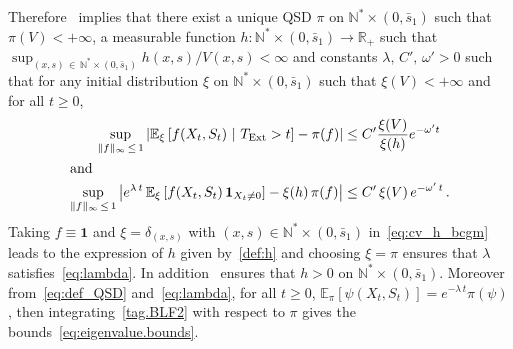 \documentclass[AHL,Unicode,longabstracts,published]{cedram}
\newcommand{\RR}{\mathbb{R}}
\newcommand{\NN}{\mathbb{N}}
\newcommand{\EE}{\mathbb{E}}
\newcommand{\X}{\NN^* \times (0,\bar s_1)}
\newcommand{\Text}{T_{\mathrm{Ext}}}
\newcommand{\1}{\mathbf{1}}
\begin{document}
Therefore~\cite[Theorem~5.1]{BCGM} implies that there exist a unique QSD $\pi$ on $\X$ such that $\pi(V)<+\infty$, a measurable function $h:\X \to \RR_+$ such that $\sup_{(x,s)\,\in\,\X}h(x,s)/V(x,s)<\infty$ and constants $\lambda, \, C',\, \omega'>0$ such that for any initial distribution $\xi$ on $\X$ such that $\xi(V)<+\infty$ and for all $t\geq 0$,
\begin{align}
\sup_{\|f \|_\infty\, \leq\,1} \left|\EE_\xi \left[f(X_t,S_t) \ | \ \Text>t\right] - \pi(f) \right| &\leq C '\frac{\xi(V)}{\xi(h)} e^{-\omega' t}\,\label{eq:cv_qsd_X}
\\
\intertext{and}
\sup_{\|f \|_\infty\,\leq\,1} \left|e^{\lambda \,t}\,\EE_\xi\left[f(X_t,S_t)\,\1_{X_t\neq 0}\right]-\xi(h)\,\pi(f)\right|&\leq C'\,\xi(V)\,e^{-\omega'\,t}\,.\label{eq:cv_h_bcgm}
\end{align}
Taking $f\equiv \1$ and $\xi=\delta_{(x,s)}$ with $(x,s)\in\X$ in~\eqref{eq:cv_h_bcgm} leads to the expression of $h$ given by~\eqref{def:h} and choosing $\xi=\pi$ ensures that $\lambda$ satisfies~\eqref{eq:lambda}. In addition~\cite[Lemma~3.4.]{BCGM} ensures that $h>0$ on $\X$. Moreover from~\eqref{eq:def_QSD} and~\eqref{eq:lambda}, for all $t\geq 0$, $\EE_\pi[\psi(X_t,S_t)]=e^{-\lambda\,t}\pi(\psi)$, then integrating~\eqref{tag.BLF2} with respect to $\pi$ gives the bounds~\eqref{eq:eigenvalue.bounds}.
\end{document}
